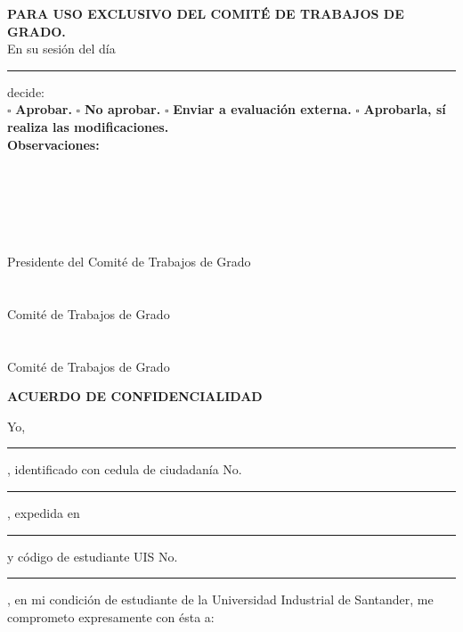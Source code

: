 \documentclass[12pt,letterpaper]{article}
\begin{document}
\newpage

\begin{framed}
\textbf{PARA USO EXCLUSIVO DEL COMITÉ DE TRABAJOS DE  GRADO.}\\
En su sesión del día \noindent\rule{5cm}{0.4pt} decide:\\
$\square$ \textbf{Aprobar.} $\square$ \textbf{No aprobar.} $\square$ \textbf{Enviar a evaluación externa.} $\square$ \textbf{Aprobarla, sí realiza las modificaciones.}\\
\textbf{Observaciones:}\\
\noindent{\rule{15cm}{0.4pt}}\\
\noindent{\rule{15cm}{0.4pt}}\\
\noindent{\rule{15cm}{0.4pt}}\\
\noindent{\rule{15cm}{0.4pt}}\\
\end{framed}
\vspace{1 cm}
\noindent{\rule{5cm}{0.4pt}}\\
Presidente del Comité de Trabajos de Grado\\
\vspace{4 pt}\\
\noindent{\rule{5cm}{0.4pt}}\\
Comité de Trabajos de Grado\\
\vspace{4 pt}\\
\noindent{\rule{5cm}{0.4pt}}\\
Comité de Trabajos de Grado\\

\newpage

\begin{center}
\textbf{ACUERDO DE CONFIDENCIALIDAD}
\end{center}
Yo, \noindent\rule{3cm}{0.4pt}, identificado con cedula de ciudadanía No.\noindent\rule{3cm}{0.4pt}, expedida en \noindent\rule{3cm}{0.4pt} y código de estudiante UIS No.\noindent\rule{3cm}{0.4pt}, en mi condición de estudiante de la Universidad Industrial de Santander, me comprometo expresamente con ésta a:
\end{document}

